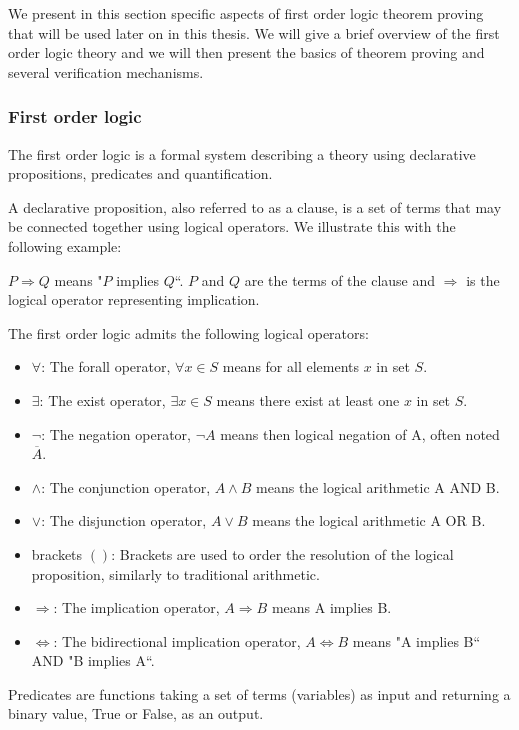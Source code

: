 \label{sec:proving-theory}
We present in this section specific aspects of first order logic theorem proving that will be used later on in this thesis. We will give a brief overview of the first order logic theory and we will then present the basics of theorem proving and several verification mechanisms.

\subsubsection{First order logic}
The first order logic is a formal system describing a theory using declarative propositions, predicates and quantification.

A declarative proposition, also referred to as a clause, is a set of terms  that may be connected together using logical operators.
We illustrate this with the following example:

$P \Rightarrow Q$ means "$P$ implies $Q$``. $P$ and $Q$ are the terms of the clause and $\Rightarrow$ is the logical operator representing implication.

The first order logic admits the following logical operators:

\begin{itemize}
    \item $\forall$: The forall operator, $\forall x\in S$ means for all elements $x$ in set $S$.
    \item $\exists$: The exist operator, $\exists x\in S$ means there exist at least one $x$ in set $S$.
    \item $\neg$: The negation operator, $\neg A$ means then logical negation of A, often noted $\overline{A}$.
    \item $\wedge$: The conjunction operator, $A \wedge B$ means the logical arithmetic A AND B.
    \item $\vee$: The disjunction operator, $A \vee B$ means the logical arithmetic A OR B.
    \item brackets $( )$: Brackets are used to order the resolution of the logical proposition, similarly to traditional arithmetic.
    \item $\Rightarrow$: The implication operator, $A \Rightarrow B$ means A implies B.
    \item $\Leftrightarrow$: The bidirectional implication operator, $A \Leftrightarrow B$ means "A implies B`` AND "B implies A``.
\end{itemize}

Predicates are functions taking a set of terms (variables) as input and returning a binary value, True or False, as an output.

